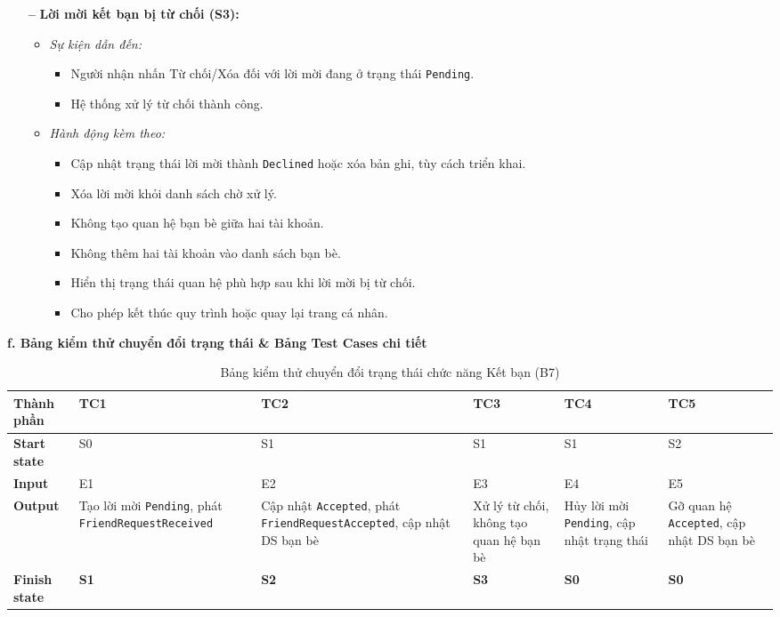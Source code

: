 \documentclass[11pt,a4paper]{article}
\begin{document}
\begin{itemize}[leftmargin=1.2cm, noitemsep]
    \item[\textbf{--}] \textbf{Lời mời kết bạn bị từ chối (S3):}
    \begin{itemize}[leftmargin=0.8cm, label=--, noitemsep]
        \item \textit{Sự kiện dẫn đến:}
        \begin{itemize}[leftmargin=0.6cm, label=$\ast$, noitemsep]
            \item Người nhận nhấn Từ chối/Xóa đối với lời mời đang ở trạng thái \texttt{Pending}.
            \item Hệ thống xử lý từ chối thành công.
        \end{itemize}
        \item \textit{Hành động kèm theo:}
        \begin{itemize}[leftmargin=0.6cm, label=$\ast$, noitemsep]
            \item Cập nhật trạng thái lời mời thành \texttt{Declined} hoặc xóa bản ghi, tùy cách triển khai.
            \item Xóa lời mời khỏi danh sách chờ xử lý.
            \item Không tạo quan hệ bạn bè giữa hai tài khoản.
            \item Không thêm hai tài khoản vào danh sách bạn bè.
            \item Hiển thị trạng thái quan hệ phù hợp sau khi lời mời bị từ chối.
            \item Cho phép kết thúc quy trình hoặc quay lại trang cá nhân.
        \end{itemize}
    \end{itemize}
\end{itemize}

\noindent\textbf{f. Bảng kiểm thử chuyển đổi trạng thái \& Bảng Test Cases chi tiết}
\begin{table}[H]
\centering
\small
\begin{tabularx}{\textwidth}{|L{2.2cm}|X|X|X|X|X|}
\hline
{}
\textbf{Thành phần} & \textbf{TC1} & \textbf{TC2} & \textbf{TC3} & \textbf{TC4} & \textbf{TC5} \tabularnewline
\hline
\textbf{Start state} & S0 & S1 & S1 & S1 & S2 \\ \hline
\textbf{Input} & E1 & E2 & E3 & E4 & E5 \\ \hline
\textbf{Output} & Tạo lời mời \texttt{Pending}, phát \texttt{FriendRequest\allowbreak Received} & Cập nhật \texttt{Accepted}, phát \texttt{FriendRequest\allowbreak Accepted}, cập nhật DS bạn bè & Xử lý từ chối, không tạo quan hệ bạn bè & Hủy lời mời \texttt{Pending}, cập nhật trạng thái & Gỡ quan hệ \texttt{Accepted}, cập nhật DS bạn bè \\ \hline
\textbf{Finish state} & \textbf{S1} & \textbf{S2} & \textbf{S3} & \textbf{S0} & \textbf{S0} \\ \hline
\end{tabularx}
\caption{Bảng kiểm thử chuyển đổi trạng thái chức năng Kết bạn (B7)}
\end{table}
\end{document}
